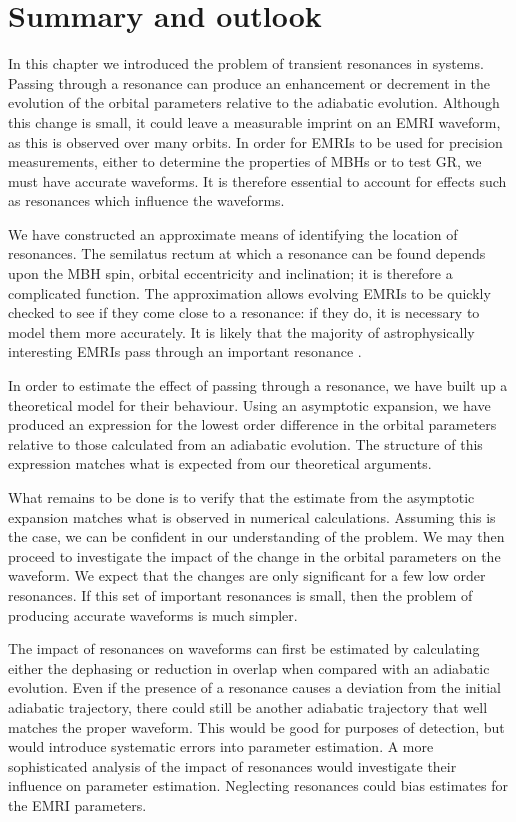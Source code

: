 \section{Summary and outlook}

In this chapter we introduced the problem of transient resonances in systems. Passing through a resonance can produce an enhancement or decrement in the evolution of the orbital parameters relative to the adiabatic evolution. Although this change is small, it could leave a measurable imprint on an EMRI waveform, as this is observed over many orbits. In order for EMRIs to be used for precision measurements, either to determine the properties of MBHs or to test GR, we must have accurate waveforms. It is therefore essential to account for effects such as resonances which influence the waveforms.

We have constructed an approximate means of identifying the location of resonances. The semilatus rectum at which a resonance can be found depends upon the MBH spin, orbital eccentricity and inclination; it is therefore a complicated function. The approximation allows evolving EMRIs to be quickly checked to see if they come close to a resonance: if they do, it is necessary to model them more accurately. It is likely that the majority of astrophysically interesting EMRIs pass through an important resonance \citep{Ruangsri2013}.

In order to estimate the effect of passing through a resonance, we have built up a theoretical model for their behaviour. Using an asymptotic expansion, we have produced an expression for the lowest order difference in the orbital parameters relative to those calculated from an adiabatic evolution. The structure of this expression matches what is expected from our theoretical arguments.

What remains to be done is to verify that the estimate from the asymptotic expansion matches what is observed in numerical calculations. Assuming this is the case, we can be confident in our understanding of the problem. We may then proceed to investigate the impact of the change in the orbital parameters on the waveform. We expect that the changes are only significant for a few low order resonances. If this set of important resonances is small, then the problem of producing accurate waveforms is much simpler.

The impact of resonances on waveforms can first be estimated by calculating either the dephasing or reduction in overlap when compared with an adiabatic evolution. Even if the presence of a resonance causes a deviation from the initial adiabatic trajectory, there could still be another adiabatic trajectory that well matches the proper waveform. This would be good for purposes of detection, but would introduce systematic errors into parameter estimation. A more sophisticated analysis of the impact of resonances would investigate their influence on parameter estimation. Neglecting resonances could bias estimates for the EMRI parameters.

